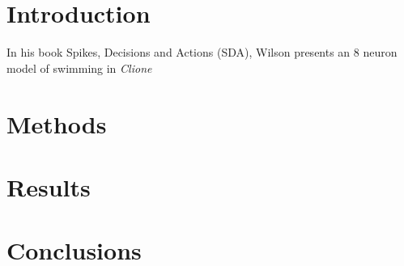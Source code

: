 \documentclass{article}
\title{\cTitle}
\author{\cAuthor}
\begin{document}
\maketitle

\section*{Introduction}
In his book Spikes, Decisions and Actions (SDA), Wilson presents an 8 neuron model of swimming in \emph{Clione}
\section*{Methods}
\section*{Results}
\section*{Conclusions}
\end{document}
